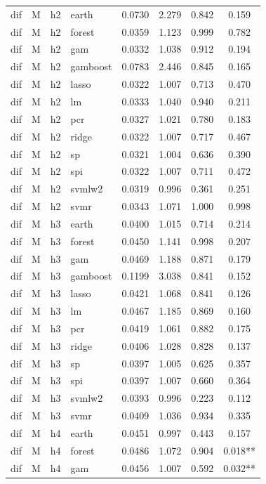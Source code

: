 \begin{ThreePartTable}
\begin{longtable}[t]{llclcccc}
dif & M & h2 & earth & 0.0730 & 2.279 & 0.842 & 0.159\\
dif & M & h2 & forest & 0.0359 & 1.123 & 0.999 & 0.782\\
dif & M & h2 & gam & 0.0332 & 1.038 & 0.912 & 0.194\\
dif & M & h2 & gamboost & 0.0783 & 2.446 & 0.845 & 0.165\\
dif & M & h2 & lasso & 0.0322 & 1.007 & 0.713 & 0.470\\
dif & M & h2 & lm & 0.0333 & 1.040 & 0.940 & 0.211\\
dif & M & h2 & pcr & 0.0327 & 1.021 & 0.780 & 0.183\\
dif & M & h2 & ridge & 0.0322 & 1.007 & 0.717 & 0.467\\
dif & M & h2 & sp & 0.0321 & 1.004 & 0.636 & 0.390\\
dif & M & h2 & spi & 0.0322 & 1.007 & 0.711 & 0.472\\
dif & M & h2 & svmlw2 & 0.0319 & 0.996 & 0.361 & 0.251\\
dif & M & h2 & svmr & 0.0343 & 1.071 & 1.000 & 0.998\\
\addlinespace
dif & M & h3 & earth & 0.0400 & 1.015 & 0.714 & 0.214\\
dif & M & h3 & forest & 0.0450 & 1.141 & 0.998 & 0.207\\
dif & M & h3 & gam & 0.0469 & 1.188 & 0.871 & 0.179\\
dif & M & h3 & gamboost & 0.1199 & 3.038 & 0.841 & 0.152\\
dif & M & h3 & lasso & 0.0421 & 1.068 & 0.841 & 0.126\\
dif & M & h3 & lm & 0.0467 & 1.185 & 0.869 & 0.160\\
dif & M & h3 & pcr & 0.0419 & 1.061 & 0.882 & 0.175\\
dif & M & h3 & ridge & 0.0406 & 1.028 & 0.828 & 0.137\\
dif & M & h3 & sp & 0.0397 & 1.005 & 0.625 & 0.357\\
dif & M & h3 & spi & 0.0397 & 1.007 & 0.660 & 0.364\\
dif & M & h3 & svmlw2 & 0.0393 & 0.996 & 0.223 & 0.112\\
dif & M & h3 & svmr & 0.0409 & 1.036 & 0.934 & 0.335\\
\addlinespace
dif & M & h4 & earth & 0.0451 & 0.997 & 0.443 & 0.157\\
dif & M & h4 & forest & 0.0486 & 1.072 & 0.904 & 0.018**\\
dif & M & h4 & gam & 0.0456 & 1.007 & 0.592 & 0.032**\\

\end{longtable}
\end{ThreePartTable}
